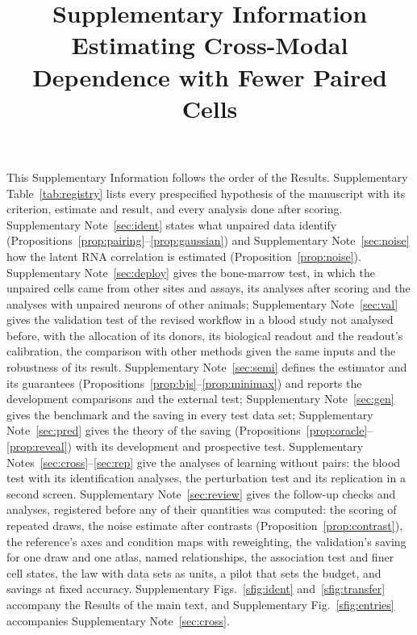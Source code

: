 \documentclass[10pt,a4paper]{article}
\title{Supplementary Information\\[4pt]\large Estimating Cross-Modal Dependence with Fewer Paired Cells}
\author{}
\date{}
\begin{document}
\maketitle
This Supplementary Information follows the order of the Results. Supplementary Table~\ref{tab:registry} lists every prespecified hypothesis of the manuscript with its criterion, estimate and result, and every analysis done after scoring. Supplementary Note~\ref{sec:ident} states what unpaired data identify (Propositions~\ref{prop:pairing}--\ref{prop:gaussian}) and Supplementary Note~\ref{sec:noise} how the latent RNA correlation is estimated (Proposition~\ref{prop:noise}). Supplementary Note~\ref{sec:deploy} gives the bone-marrow test, in which the unpaired cells came from other sites and assays, its analyses after scoring and the analyses with unpaired neurons of other animals; Supplementary Note~\ref{sec:val} gives the validation test of the revised workflow in a blood study not analysed before, with the allocation of its donors, its biological readout and the readout's calibration, the comparison with other methods given the same inputs and the robustness of its result. Supplementary Note~\ref{sec:semi} defines the estimator and its guarantees (Propositions~\ref{prop:bjs}--\ref{prop:minimax}) and reports the development comparisons and the external test; Supplementary Note~\ref{sec:gen} gives the benchmark and the saving in every test data set; Supplementary Note~\ref{sec:pred} gives the theory of the saving (Propositions~\ref{prop:oracle}--\ref{prop:reveal}) with its development and prospective test. Supplementary Notes~\ref{sec:cross}--\ref{sec:rep} give the analyses of learning without pairs: the blood test with its identification analyses, the perturbation test and its replication in a second screen. Supplementary Note~\ref{sec:review} gives the follow-up checks and analyses, registered before any of their quantities was computed: the scoring of repeated draws, the noise estimate after contrasts (Proposition~\ref{prop:contrast}), the reference's axes and condition maps with reweighting, the validation's saving for one draw and one atlas, named relationships, the association test and finer cell states, the law with data sets as units, a pilot that sets the budget, and savings at fixed accuracy. Supplementary Figs.~\ref{sfig:ident} and~\ref{sfig:transfer} accompany the Results of the main text, and Supplementary Fig.~\ref{sfig:entries} accompanies Supplementary Note~\ref{sec:cross}.
\end{document}
